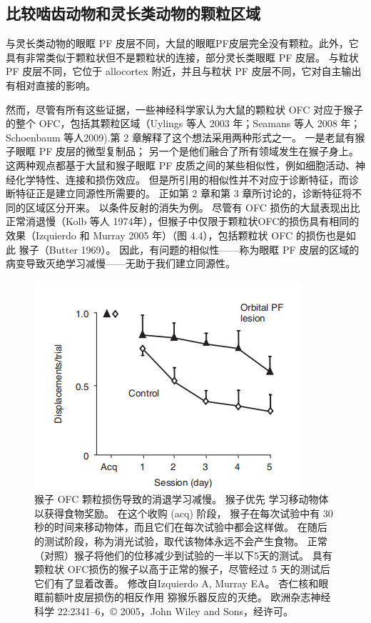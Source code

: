 \subsection{比较啮齿动物和灵长类动物的颗粒区域}
与灵长类动物的眼眶 PF 皮层不同，大鼠的眼眶PF皮层完全没有颗粒。此外，它具有非常类似于颗粒状但不是颗粒状的连接，部分灵长类眼眶 PF 皮层。 与粒状 PF 皮层不同，它位于 allocortex 附近，并且与粒状 PF 皮层不同，它对自主输出有相对直接的影响。\par
然而，尽管有所有这些证据，一些神经科学家认为大鼠的颗粒状 OFC 对应于猴子的整个 OFC，包括其颗粒区域（Uylings 等人 2003 年；Seamans 等人 2008 年；Schoenbaum 等人2009).第 2 章解释了这个想法采用两种形式之一。 一是老鼠有猴子眼眶 PF 皮层的微型复制品； 另一个是他们融合了所有领域发生在猴子身上。 这两种观点都基于大鼠和猴子眼眶 PF 皮质之间的某些相似性，例如细胞活动、神经化学特性、连接和损伤效应。
但是所引用的相似性并不对应于诊断特征，而诊断特征正是建立同源性所需要的。 正如第 2 章和第 3 章所讨论的，诊断特征将不同的区域区分开来。 以条件反射的消失为例。 尽管有 OFC 损伤的大鼠表现出比正常消退慢（Kolb 等人 1974年），但猴子中仅限于颗粒状OFC的损伤具有相同的效果（Izquierdo 和 Murray 2005 年）（图 4.4），包括颗粒状 OFC 的损伤也是如此 猴子（Butter 1969）。 因此，有问题的相似性——称为眼眶 PF 皮层的区域的病变导致灭绝学习减慢——无助于我们建立同源性。\par
\begin{figure}[!htb]
	\centering
	\includegraphics{image_pfc/Fig_4_4}
	\caption{猴子 OFC 颗粒损伤导致的消退学习减慢。 猴子优先
		学习移动物体以获得食物奖励。 在这个收购 (acq) 阶段，
		猴子在每次试验中有 30 秒的时间来移动物体，而且它们在每次试验中都会这样做。 在随后的测试阶段，称为消光试验，取代该物体永远不会产生食物。 正常（对照）猴子将他们的位移减少到试验的一半以下5天的测试。 具有颗粒状 OFC损伤的猴子以高于正常的猴子，尽管经过 5 天的测试后它们有了显着改善。 修改自Izquierdo A, Murray EA。 杏仁核和眼眶前额叶皮层损伤的相反作用
		猕猴乐器反应的灭绝。 欧洲杂志神经科学 22:2341–6，© 2005，John Wiley and Sons，经许可。}
\end{figure}
